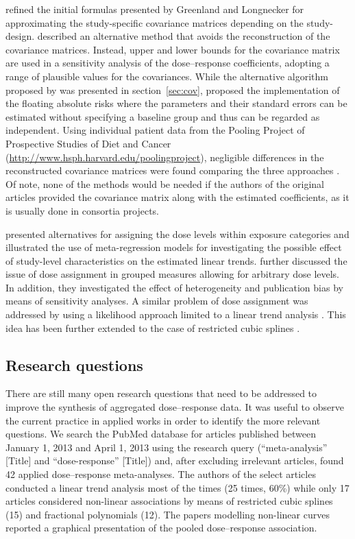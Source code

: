\documentclass[11pt,a4paper,twoside,openany]{book}\usepackage{knitr}
\begin{document}
{\cite{orsini2006generalized} refined the initial formulas presented by Greenland and Longnecker for approximating the study-specific covariance matrices depending on the study-design. \cite{berrington2003generalized} described an alternative method that avoids the reconstruction of the covariance matrices. Instead, upper and lower bounds for the covariance matrix are used in a sensitivity analysis of the dose--response coefficients, adopting a range of plausible values for the covariances. While the alternative algorithm proposed by \cite{hamling2008facilitating} was presented in section~\ref{sec:cov}, \cite{easton1991floating} proposed the implementation of the floating absolute risks where the parameters and their standard errors can be estimated without specifying a baseline group and thus can be regarded as independent. Using individual patient data from the Pooling Project of Prospective Studies of Diet and Cancer (\url{http://www.hsph.harvard.edu/poolingproject}), negligible differences in the reconstructed covariance matrices were found comparing the three approaches \citep{orsini2011meta}. Of note, none of the methods would be needed if the authors of the original articles provided the covariance matrix along with the estimated coefficients, as it is usually done in consortia projects.

\cite{berlin1993meta} presented alternatives for assigning the dose levels within exposure categories and illustrated the use of meta-regression models for investigating the possible effect of study-level characteristics on the estimated linear trends. \cite{shi2004meta} further discussed the issue of dose assignment in grouped measures allowing for arbitrary dose levels. In addition, they investigated the effect of heterogeneity and publication bias by means of sensitivity analyses. A similar problem of dose assignment was addressed by using a likelihood approach limited to a linear trend analysis \citep{takahashi2010assignment}. This idea has been further extended to the case of restricted cubic splines \citep{takahashi2013cubic}.

\subsection{Research questions}

There are still many open research questions that need to be addressed to improve the synthesis of aggregated dose--response data. It was useful to observe the current practice in applied works in order to identify the more relevant questions. We search the PubMed database for articles published between January 1, 2013 and April 1, 2013 using the research query (``meta-analysis'' [Title] and ``dose-response'' [Title]) and, after excluding irrelevant articles, found 42 applied dose--response meta-analyses. The authors of the select articles conducted a linear trend analysis most of the times (25 times, 60\%) while only 17 articles considered non-linear associations by means of restricted cubic splines (15) and fractional polynomials (12). The papers modelling non-linear curves reported a graphical presentation of the pooled dose--response association.

}
\end{document}
